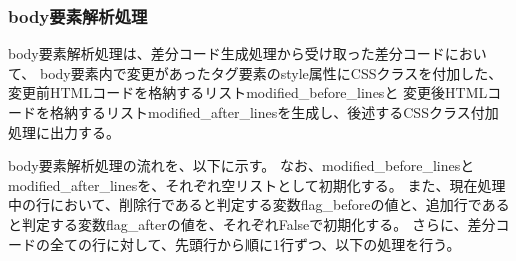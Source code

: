 \subsubsection{body要素解析処理}\label{subsubsec: body_analysis}
body要素解析処理は、差分コード生成処理から受け取った差分コードにおいて、
body要素内で変更があったタグ要素のstyle属性にCSSクラス\cite{CssSelector}を付加した、変更前HTMLコードを格納するリストmodified\_before\_linesと
変更後HTMLコードを格納するリストmodified\_after\_linesを生成し、後述するCSSクラス付加処理に出力する。
\par
body要素解析処理の流れを、以下に示す。
なお、modified\_before\_linesとmodified\_after\_linesを、それぞれ空リストとして初期化する。
また、現在処理中の行において、削除行であると判定する変数flag\_beforeの値と、追加行であると判定する変数flag\_afterの値を、それぞれFalseで初期化する。
さらに、差分コードの全ての行に対して、先頭行から順に1行ずつ、以下の処理を行う。
